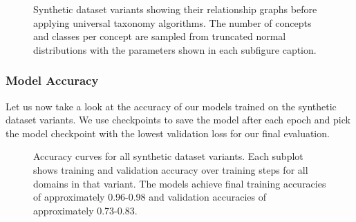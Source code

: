 \begin{figure}[H]
      \caption{Synthetic dataset variants showing their relationship graphs before applying universal taxonomy algorithms.
            The number of concepts and classes per concept are sampled from truncated normal distributions with the parameters shown in each subfigure caption.}
      \label{fig:synthetic_variants}
\end{figure}

\subsubsection{Model Accuracy}

Let us now take a look at the accuracy of our models trained on the synthetic dataset variants.
We use checkpoints to save the model after each epoch and pick the model checkpoint with the lowest validation loss
for our final evaluation.

\begin{figure}[H]
      \centering
      \resizebox{0.6\textwidth}{!}{}

      \caption{Accuracy curves for all synthetic dataset variants.
            Each subplot shows training and validation accuracy over training steps for all domains in that variant.
            The models achieve final training accuracies of approximately 0.96-0.98 and validation accuracies of approximately 0.73-0.83.}
      \label{fig:all_training_runs}
\end{figure}



